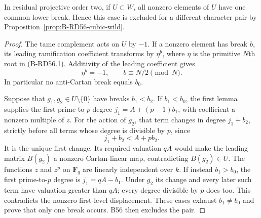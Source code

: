 \begin{lemma}
\label{lem:B-RD57-anti}
In residual projective order two, if $U\subset W$, all nonzero
elements of $U$ have one common lower break. Hence this case is
excluded for a different-character pair by
Proposition~\ref{prop:B-RD56-cubic-wild}.
\end{lemma}
\begin{proof}
The tame complement acts on $U$ by $-1$. If a nonzero element
has break $b$, its leading ramification coefficient transforms
by $\eta^b$, where $\eta$ is the primitive $N$th root in
(B-RD56.1). Additivity of the leading coefficient gives
\[
                         \eta^b=-1,
              \qquad b\equiv N/2\pmod N.                \tag{B-RD57.1}
\]
In particular no anti-Cartan break equals $b_0$.

Suppose that $g_1,g_2\in U\setminus\{0\}$ have breaks
$b_1<b_2$. If $b_1<b_0$, the first lemma supplies the first
prime-to-$p$ degree $j_1=A+(p-1)b_1$, with coefficient a
nonzero multiple of $z$. For the action of $g_2$, that term
changes in degree $j_1+b_2$, strictly before all terms whose
degree is divisible by $p$, since
\[
                         j_1+b_2<A+pb_2.
\]
It is the unique first change. Its required valuation $qA$
would make the leading matrix $B(g_2)$ a nonzero Cartan-linear
map, contradicting $B(g_2)\in U$. The functions $z$ and $z^p$
on $\mathbf F_q$ are linearly independent over $k$.
If instead $b_1>b_0$, the first prime-to-$p$ degree is
$j_1=qA-b_1$. Under $g_2$ its change and every later such
term have valuation greater than $qA$; every degree divisible
by $p$ does too. This contradicts the nonzero first-level
displacement. These cases exhaust $b_1\ne b_0$ and prove
that only one break occurs. B56 then excludes the pair.
\end{proof}

